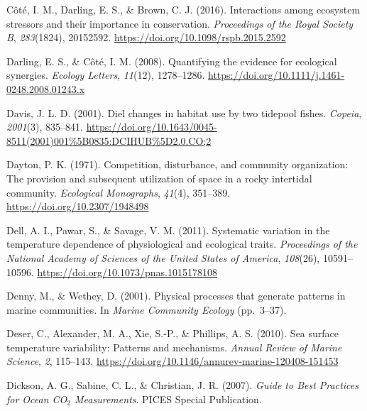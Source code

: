 \documentclass{CSUNthesis}
\begin{document}
Côté, I. M., Darling, E. S., \& Brown, C. J. (2016). Interactions among ecosystem stressors and their importance in conservation. \textit{Proceedings of the Royal Society B}, \textit{283}(1824), 20152592. \url{https://doi.org/10.1098/rspb.2015.2592}

\vspace{0.1em}

Darling, E. S., \& Côté, I. M. (2008). Quantifying the evidence for ecological synergies. \textit{Ecology Letters}, \textit{11}(12), 1278--1286. \url{https://doi.org/10.1111/j.1461-0248.2008.01243.x}

\vspace{0.1em}

Davis, J. L. D. (2001). Diel changes in habitat use by two tidepool fishes. \textit{Copeia}, \textit{2001}(3), 835--841. \url{https://doi.org/10.1643/0045-8511(2001)001\%5B0835:DCIHUB\%5D2.0.CO;2}

\vspace{0.1em}

Dayton, P. K. (1971). Competition, disturbance, and community organization: The provision and subsequent utilization of space in a rocky intertidal community. \textit{Ecological Monographs}, \textit{41}(4), 351--389. \url{https://doi.org/10.2307/1948498}

\vspace{0.1em}

Dell, A. I., Pawar, S., \& Savage, V. M. (2011). Systematic variation in the temperature dependence of physiological and ecological traits. \textit{Proceedings of the National Academy of Sciences of the United States of America}, \textit{108}(26), 10591--10596. \url{https://doi.org/10.1073/pnas.1015178108}

\vspace{0.1em}

Denny, M., \& Wethey, D. (2001). Physical processes that generate patterns in marine communities. In \textit{Marine Community Ecology} (pp.~3--37).

\vspace{0.1em}

Deser, C., Alexander, M. A., Xie, S.-P., \& Phillips, A. S. (2010). Sea surface temperature variability: Patterns and mechanisms. \textit{Annual Review of Marine Science}, \textit{2}, 115--143. \url{https://doi.org/10.1146/annurev-marine-120408-151453}

\vspace{0.1em}

Dickson, A. G., Sabine, C. L., \& Christian, J. R. (2007). \textit{Guide to Best Practices for Ocean CO$_2$ Measurements}. PICES Special Publication.
\end{document}
